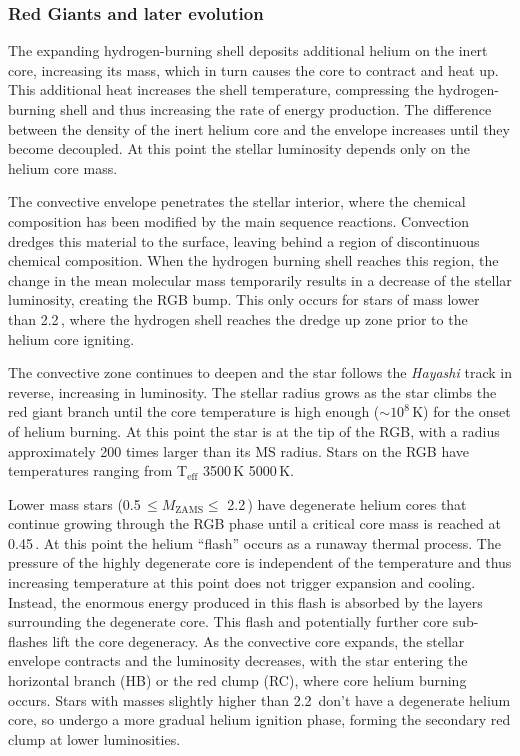 \subsubsection{Red Giants and later evolution}

The expanding hydrogen-burning shell deposits additional helium on the inert core, increasing its mass, which in turn causes the core to contract and heat up. This additional heat increases the shell temperature, compressing the hydrogen-burning shell and thus increasing the rate of energy production. The difference between the density of the inert helium core and the envelope increases until they become decoupled. At this point the stellar luminosity depends only on the helium core mass.

The convective envelope penetrates the stellar interior, where the chemical composition has been modified by the main sequence reactions. Convection dredges this material to the surface, leaving behind a region of discontinuous chemical composition. When the hydrogen burning shell reaches this region, the change in the mean molecular mass temporarily results in a decrease of the stellar luminosity, creating the RGB bump. This only occurs for stars of mass lower than 2.2\,\Msol{}, where the hydrogen shell reaches the dredge up zone prior to the helium core igniting.

The convective zone continues to deepen and the star follows the {\em Hayashi} track in reverse, increasing in luminosity. The stellar radius grows as the star climbs the red giant branch until the core temperature is high enough ($\sim10^8$\,K) for the onset of helium burning. At this point the star is at the tip of the RGB, with a radius approximately 200 times larger than its MS radius. Stars on the RGB have temperatures ranging from T$_\mathrm{eff}$ \texttildelow{}3500\,K \textendash{} 5000\,K.

Lower mass stars (0.5\,\Msol$ \leq M_{\mathrm{ZAMS}} \leq $ 2.2\,\Msol{}) have degenerate helium cores that continue growing through the RGB phase until a critical core mass is reached at \texttildelow{}0.45\,\Msol{}. At this point the helium ``flash'' occurs as a runaway thermal process. The pressure of the highly degenerate core is independent of the temperature and thus increasing temperature at this point does not trigger expansion and cooling. Instead, the enormous energy produced in this flash is absorbed by the layers surrounding the degenerate core. This flash and potentially further core sub-flashes lift the core degeneracy. As the convective core expands, the stellar envelope contracts and the luminosity decreases, with the star entering the horizontal branch (HB) or the red clump (RC), where core helium burning occurs. Stars with masses slightly higher than 2.2\,\Msol{} don't have a degenerate helium core, so undergo a more gradual helium ignition phase, forming the secondary red clump at lower luminosities.

